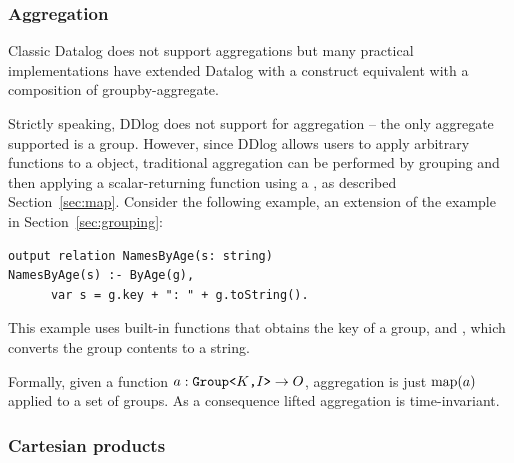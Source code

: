 
\subsubsection{Aggregation}\label{sec:aggregation}  

Classic Datalog does not support aggregations
but many practical implementations have extended Datalog with
a construct equivalent with a composition of groupby-aggregate. 

Strictly speaking, DDlog does not support for aggregation -- the only
aggregate supported is a group.  However, since DDlog allows users to apply arbitrary
functions to a  object, traditional aggregation can be performed
by grouping and then applying a scalar-returning function using a , as described
Section~\ref{sec:map}.  Consider the following example, an extension of 
the example in Section~\ref{sec:grouping}:

\begin{lstlisting}[language=ddlog]
output relation NamesByAge(s: string) 
NamesByAge(s) :- ByAge(g), 
      var s = g.key + ": " + g.toString().  
\end{lstlisting}

This example uses built-in functions  that obtains the key of a group, 
and , which converts the group contents to a string.

Formally, given a function $a: \mbox{\texttt{Group<$K$,$I$>}} \to O$, 
aggregation is just $\mbox{map}(a)$ applied to a set of groups.  As a consequence
lifted aggregation is time-invariant.

\subsubsection{Cartesian products}\label{sec:cartesian}


